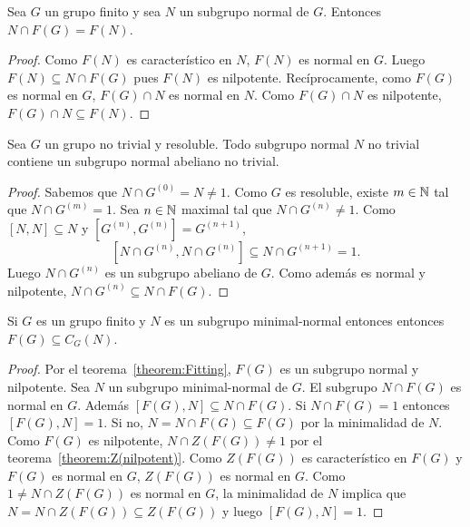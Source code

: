 \begin{corollary}
	\label{corollary:McapF(G)}
	Sea $G$ un grupo finito y sea $N$ un subgrupo normal de $G$. Entonces
	$N\cap F(G)=F(N)$.
\end{corollary}

\begin{proof}
	Como $F(N)$ es característico en $N$, $F(N)$ es normal en $G$. Luego
	$F(N)\subseteq N\cap F(G)$ pues $F(N)$ es nilpotente. Recíprocamente, como
	$F(G)$ es normal en $G$, $F(G)\cap N$ es normal en $N$. Como $F(G)\cap N$
	es nilpotente, $F(G)\cap N\subseteq F(N)$. 
\end{proof}

\begin{theorem}
	Sea $G$ un grupo no trivial y resoluble. Todo subgrupo normal $N$ no
	trivial contiene un subgrupo normal abeliano no trivial. 
\end{theorem}

\begin{proof}
	Sabemos que $N\cap G^{(0)}=N\ne 1$. Como $G$ es resoluble, existe $m\in\mathbb{N}$ tal que $N\cap
	G^{(m)}=1$. Sea $n\in\mathbb{N}$ maximal tal que $N\cap G^{(n)}\ne
	1$. Como $[N,N]\subseteq N$ y $[G^{(n)},G^{(n)}]=G^{(n+1)}$, 
	\[
	[N\cap G^{(n)},N\cap G^{(n)}]\subseteq N\cap G^{(n+1)}=1.
	\]
	Luego $N\cap G^{(n)}$ es un subgrupo abeliano de $G$. Como además es normal
	y nilpotente, $N\cap G^{(n)}\subseteq N\cap F(G)$.
\end{proof}

\begin{theorem}
	\label{theorem:F(G)centraliza}
	Si $G$ es un grupo finito y $N$ es un subgrupo minimal-normal entonces
	entonces $F(G)\subseteq C_G(N)$.
\end{theorem}

\begin{proof}
	Por el teorema~\ref{theorem:Fitting}, $F(G)$ es un subgrupo normal y nilpotente. 
	Sea $N$ un subgrupo minimal-normal de $G$. 
	El subgrupo $N\cap F(G)$
	es normal en $G$.  Además $[F(G),N]\subseteq N\cap F(G)$. Si $N\cap F(G)=1$ entonces
	$[F(G),N]=1$. Si no, $N=N\cap F(G)\subseteq F(G)$ por la minimalidad de $N$. Como
	$F(G)$ es nilpotente, $N\cap Z(F(G))\ne 1$ por el
	teorema~\ref{theorem:Z(nilpotent)}. Como $Z(F(G))$ es característico en $F(G)$ y
	$F(G)$ es normal en $G$, $Z(F(G))$ es normal en $G$. Como $1\ne N\cap Z(F(G))$ es
	normal en $G$, la minimalidad de $N$ implica que $N=N\cap Z(F(G))\subseteq
	Z(F(G))$ y luego $[F(G),N]=1$. 
\end{proof}

